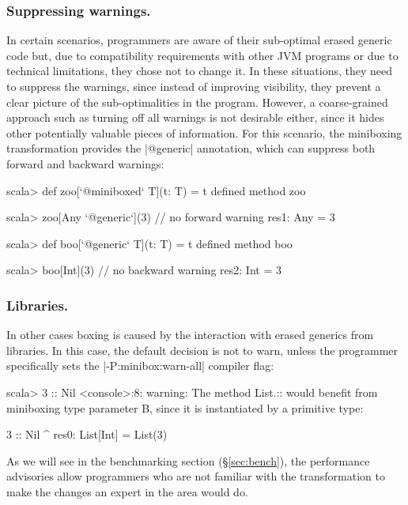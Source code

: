 \subsubsection{Suppressing warnings.} In certain scenarios, programmers are aware of their sub-optimal erased generic code but, due to compatibility requirements with other JVM programs or due to technical limitations, they chose not to change it. In these situations, they need to suppress the warnings, since instead of improving visibility, they prevent a clear picture of the sub-optimalities in the program. However, a coarse-grained approach such as turning off all warnings is not desirable either, since it hides other potentially valuable pieces of information. For this scenario, the miniboxing transformation provides the |@generic| annotation, which can suppress both forward and backward warnings:

\begin{lstlisting-nobreak}
 scala> def zoo[`@miniboxed` T](t: T) = t
 defined method zoo

 scala> zoo[Any `@generic`](3) // no forward warning
 res1: Any = 3

 scala> def boo[`@generic` T](t: T) = t
 defined method boo

 scala> boo[Int](3)                   // no backward warning
 res2: Int = 3
\end{lstlisting-nobreak}


\subsubsection{Libraries.} In other cases boxing is caused by the interaction with erased generics from libraries. In this case, the default decision is not to warn, unless the programmer specifically sets the |-P:minibox:warn-all| compiler flag:

\begin{lstlisting-nobreak}
 scala> 3 :: Nil
 <console>:8: warning: The method List.:: would benefit from miniboxing type parameter B, since it is instantiated by a primitive type:

               3 :: Nil
                 ^
 res0: List[Int] = List(3)
\end{lstlisting-nobreak}

As we will see in the benchmarking section (\S\ref{sec:bench}), the performance advisories allow programmers who are not familiar with the transformation to make the changes an expert in the area would do.

